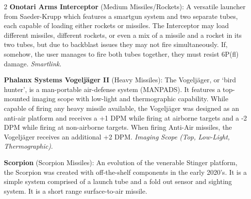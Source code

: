 \documentclass[
  oneside]{article}
\begin{document}
\begin{multicols}{2}
\textbf{Onotari Arms Interceptor} (Medium
Missiles/Rockets): A versatile launcher from
Saeder-Krupp which features a smartgun system and
two separate tubes, each capable of loading either
rockets or missiles. The Interceptor may load
different missiles, different rockets, or even a
mix of a missile and a rocket in its two tubes,
but due to backblast issues they may not fire
simultaneously. If, somehow, the user manages to
fire both tubes together, they must resist 6P(fl)
damage. \emph{Smartlink}.

\textbf{Phalanx Systems Vogeljäger II} (Heavy
Missiles): The Vogeljäger, or `bird hunter', is a
man-portable air-defense system (MANPADS). It
features a top-mounted imaging scope with
low-light and thermographic capability. While
capable of firing any heavy missile available, the
Vogeljäger was designed as an anti-air platform
and receives a +1 DPM while firing at airborne
targets and a -2 DPM while firing at non-airborne
targets. When firing Anti-Air missiles, the
Vogeljäger receives an additional +2 DPM.
\emph{Imaging Scope (Top, Low-Light,
Thermographic)}.

\textbf{Scorpion} (Scorpion Missiles): An
evolution of the venerable Stinger platform, the
Scorpion was created with off-the-shelf components
in the early 2020's. It is a simple system
comprised of a launch tube and a fold out sensor
and sighting system. It is a short range
surface-to-air missile.

\end{multicols}
\end{document}
